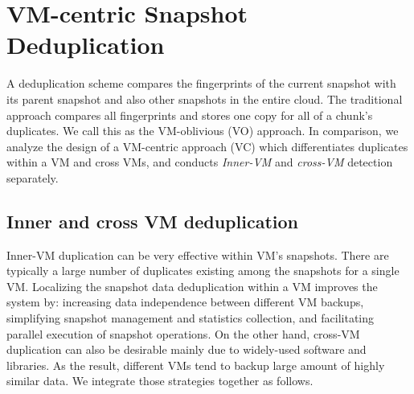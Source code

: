 \section{VM-centric Snapshot Deduplication}
\label{sect:dedupe}


A deduplication scheme compares the fingerprints of the current snapshot
with its parent snapshot and also other snapshots in the entire cloud.
The traditional approach compares all fingerprints and 
stores one copy for all of a chunk's duplicates.
We call this as  the VM-oblivious (VO) approach.
In comparison, we analyze the design of
a VM-centric approach (VC) which differentiates duplicates within a VM and cross VMs,
and conducts \textit{Inner-VM} and \textit{cross-VM} detection separately. 

\subsection{Inner and cross VM deduplication}

Inner-VM duplication can be very effective within VM's snapshots. There
are typically a large number of duplicates existing among the snapshots
for a single VM.  Localizing the snapshot data deduplication within a VM
improves the system by:
increasing data independence between different VM backups,
simplifying snapshot management and statistics collection,
and facilitating parallel execution of snapshot operations.
On the other hand, cross-VM duplication can also be desirable mainly due to widely-used software and libraries. 
As the result, different VMs tend to backup large amount of highly similar data.
We integrate those strategies together as follows.

